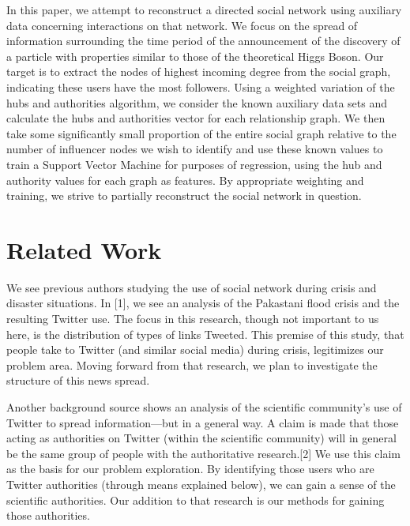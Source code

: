 \documentclass{sig-alternate-10pt}
\begin{document}
In this paper, we attempt to reconstruct a directed social network using auxiliary data concerning interactions on that network.
We focus on the spread of information surrounding the time period of the announcement of the discovery of a particle with properties similar to those of the theoretical Higgs Boson.
Our target is to extract the nodes of highest incoming degree from the social graph, indicating these users have the most followers.
Using a weighted variation of the hubs and authorities algorithm, we consider the known auxiliary data sets and calculate the hubs and authorities vector for each relationship graph.
We then take some significantly small proportion of the entire social graph relative to the number of influencer nodes we wish to identify and use these known values to train a Support Vector Machine for purposes of regression, using the hub and authority values for each graph as features.
By appropriate weighting and training, we strive to partially reconstruct the social network in question.


\section{Related Work}

We see previous authors studying the use of social network during crisis and disaster situations.
In [1], we see an analysis of the Pakastani flood crisis and the resulting Twitter use.
The focus in this research, though not important to us here, is the distribution of types of links Tweeted.
This premise of this study, that people take to Twitter (and similar social media) during crisis, legitimizes our problem area.
Moving forward from that research, we plan to investigate the structure of this news spread.

Another background source shows an analysis of the scientific community's use of Twitter to spread information---but in a general way.
A claim is made that those acting as authorities on Twitter (within the scientific community) will in general be the same group of people with the authoritative research.[2]
We use this claim as the basis for our problem exploration.
By identifying those users who are Twitter authorities (through means explained below), we can gain a sense of the scientific authorities.
Our addition to that research is our methods for gaining those authorities.
\end{document}
